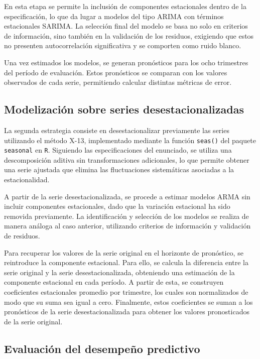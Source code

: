 \documentclass[12pt,a4paper]{article}
\begin{document}
	En esta etapa se permite la inclusión de componentes estacionales dentro de la especificación, lo que da lugar a modelos del tipo ARIMA con términos estacionales SARIMA. La selección final del modelo se basa no solo en criterios de información, sino también en la validación de los residuos, exigiendo que estos no presenten autocorrelación significativa y se comporten como ruido blanco.
	
	Una vez estimados los modelos, se generan pronósticos para los ocho trimestres del período de evaluación. Estos pronósticos se comparan con los valores observados de cada serie, permitiendo calcular distintas métricas de error.
	
	\subsection{Modelización sobre series desestacionalizadas}
	
	La segunda estrategia consiste en desestacionalizar previamente las series utilizando el método X-13, implementado mediante la función \texttt{seas()} del paquete \texttt{seasonal} en \texttt{R}. Siguiendo las especificaciones del enunciado, se utiliza una descomposición aditiva sin transformaciones adicionales, lo que permite obtener una serie ajustada que elimina las fluctuaciones sistemáticas asociadas a la estacionalidad. 
	
	A partir de la serie desestacionalizada, se procede a estimar modelos ARMA sin incluir componentes estacionales, dado que la variación estacional ha sido removida previamente. La identificación y selección de los modelos se realiza de manera análoga al caso anterior, utilizando criterios de información y validación de residuos.
	
	Para recuperar los valores de la serie original en el horizonte de pronóstico, se reintroduce la componente estacional. Para ello, se calcula la diferencia entre la serie original y la serie desestacionalizada, obteniendo una estimación de la componente estacional en cada período. A partir de esta, se construyen coeficientes estacionales promedio por trimestre, los cuales son normalizados de modo que su suma sea igual a cero. Finalmente, estos coeficientes se suman a los pronósticos de la serie desestacionalizada para obtener los valores pronosticados de la serie original.
	
	\subsection{Evaluación del desempeño predictivo}
	
\end{document}
